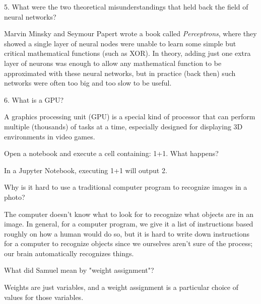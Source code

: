 \documentclass[12pt,a4paper]{article}
\begin{document}
5. What were the two theoretical misunderstandings that held back the field of neural networks? \\

\smallbreak

Marvin Minsky and Seymour Papert wrote a book called \textit{Perceptrons}, where they showed a single layer of neural nodes were unable to learn some simple but critical mathematical functions (such as XOR). In theory, adding just one extra layer of neurons was enough to allow any mathematical function to be approximated with these neural networks, but in practice (back then) such networks were often too big and too slow to be useful.

\bigbreak

6. What is a GPU? \\

\smallbreak

A graphics processing unit (GPU) is a special kind of processor that can perform multiple (thousands) of tasks at a time, especially designed for displaying 3D environments in video games.

\bigbreak

Open a notebook and execute a cell containing: 1+1. What happens? \\

\smallbreak

In a Jupyter Notebook, executing 1+1 will output 2.

\bigbreak

Why is it hard to use a traditional computer program to recognize images in a photo? \\

\smallbreak

The computer doesn't know what to look for to recognize what objects are in an image. In general, for a computer program, we give it a list of instructions based roughly on how a human would do so, but it is hard to write down instructions for a computer to recognize objects since we ourselves aren't sure of the process; our brain automatically recognizes things.

\bigbreak

What did Samuel mean by "weight assignment"? \\

\smallbreak

Weights are just variables, and a weight assignment is a particular choice of values for those variables.

\bigbreak
\end{document}
